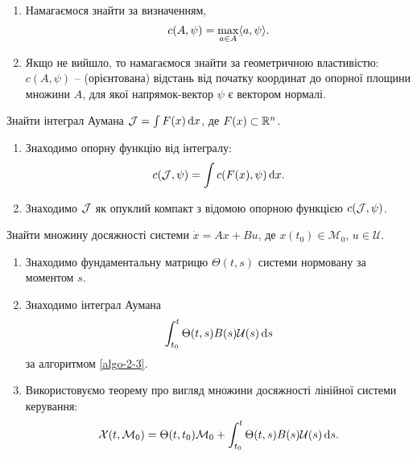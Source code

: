 \begin{algorithm}
	\label{algo-2-2}
	\begin{enumerate}
		\item Намагаємося знайти за визначенням,
		\begin{equation}
		 	\label{eq:2.4}
		 	c(A,\psi) = \displaystyle\max\limits_{a\in A} \langle a, \psi \rangle.
		\end{equation}
		\item Якщо не вийшло, то намагаємося знайти за геометричною властивістю: $c(A,\psi)$ -- (орієнтована) відстань від початку координат до опорної площини множини $A$, для якої напрямок-вектор $\psi$ є вектором нормалі.
	\end{enumerate}
\end{algorithm}

\vspace*{\baselineskip}

\begin{problem*}
	Знайти інтеграл Аумана $\mathcal{J} = \int F(x) \mathop{}\!\mathrm{d} x$, де $F(x)\subset\mathbb{R}^n$.
\end{problem*}

\begin{algorithm}
	\label{algo-2-3}
	\begin{enumerate}
		\item Знаходимо опорну функцію від інтегралу:
		\begin{equation}
		 	\label{eq:2.5}
		 	c(\mathcal{J}, \psi) = \int c (F(x), \psi) \mathop{}\!\mathrm{d} x.
		\end{equation}
		\item Знаходимо $\mathcal{J}$ як опуклий компакт з відомою опорною функцією $c(\mathcal{J}, \psi)$.
	\end{enumerate}
\end{algorithm}

\vspace*{\baselineskip}

\begin{problem*}
	Знайти множину досяжності системи $\dot x = A x + B u$, де $x(t_0) \in \mathcal{M}_0$, $u \in \mathcal{U}$.
\end{problem*}

\begin{algorithm}
	\label{algo-2-4}
	\begin{enumerate}
		\item Знаходимо фундаментальну матрицю $\Theta(t,s)$ системи нормовану за моментом $s$.
		\item Знаходимо інтеграл Аумана
		\begin{equation}
			\label{eq:2.6}
			\int_{t_0}^t \Theta(t, s) B(s) \mathcal{U}(s) \mathop{}\!\mathrm{d} s
		\end{equation}
		за алгоритмом \ref{algo-2-3}.
		\item Використовуємо теорему про вигляд множини досяжності лінійної системи керування:
		\begin{equation}
			\label{eq:2.7}
		 	\mathcal{X}(t, \mathcal{M}_0) = \Theta(t, t_0) \mathcal{M}_0 + \int_{t_0}^t \Theta(t, s)B(s)\mathcal{U}(s) \mathop{}\!\mathrm{d} s.
		\end{equation}
	\end{enumerate}
\end{algorithm}

